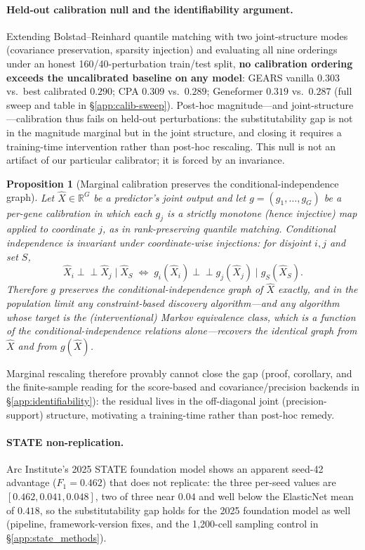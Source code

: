 \documentclass{article}
\theoremstyle{plain}
\newtheorem{proposition}[theorem]{Proposition}
\theoremstyle{definition}
\theoremstyle{remark}
\begin{document}
\paragraph{Held-out calibration null and the identifiability argument.}
\label{sec:calib-sweep}
Extending Bolstad--Reinhard quantile matching with two joint-structure modes (covariance preservation, sparsity injection) and evaluating all nine orderings under an honest 160/40-perturbation train/test split, \textbf{no calibration ordering exceeds the uncalibrated baseline on any model}: GEARS vanilla $0.303$ vs.\ best calibrated $0.290$; CPA $0.309$ vs.\ $0.289$; Geneformer $0.319$ vs.\ $0.287$ (full sweep and table in \S\ref{app:calib-sweep}). Post-hoc magnitude---and joint-structure---calibration thus fails on held-out perturbations: the substitutability gap is not in the magnitude marginal but in the joint structure, and closing it requires a training-time intervention rather than post-hoc rescaling. This null is not an artifact of our particular calibrator; it is forced by an invariance.

\begin{proposition}[Marginal calibration preserves the conditional-independence graph]
\label{prop:ci-invariance}
Let $\hat X \in \mathbb{R}^{G}$ be a predictor's joint output and let $g=(g_1,\dots,g_G)$ be a per-gene calibration in which each $g_j$ is a strictly monotone (hence injective) map applied to coordinate $j$, as in rank-preserving quantile matching. Conditional independence is invariant under coordinate-wise injections: for disjoint $i,j$ and set $S$,
\[
\hat X_i \perp\!\!\!\perp \hat X_j \mid \hat X_S \;\iff\; g_i(\hat X_i) \perp\!\!\!\perp g_j(\hat X_j) \mid g_S(\hat X_S).
\]
Therefore $g$ preserves the conditional-independence graph of $\hat X$ exactly, and in the population limit any constraint-based discovery algorithm---and any algorithm whose target is the (interventional) Markov equivalence class, which is a function of the conditional-independence relations alone---recovers the identical graph from $\hat X$ and from $g(\hat X)$.
\end{proposition}

Marginal rescaling therefore provably cannot close the gap (proof, corollary, and the finite-sample reading for the score-based and covariance/precision backends in \S\ref{app:identifiability}): the residual lives in the off-diagonal joint (precision-support) structure, motivating a training-time rather than post-hoc remedy.

\paragraph{STATE non-replication.}
\label{sec:state-multi-seed}
Arc Institute's 2025 STATE foundation model shows an apparent seed-42 advantage ($F_1 = 0.462$) that does not replicate: the three per-seed values are $[0.462, 0.041, 0.048]$, two of three near $0.04$ and well below the ElasticNet mean of $0.418$, so the substitutability gap holds for the 2025 foundation model as well (pipeline, framework-version fixes, and the 1{,}200-cell sampling control in \S\ref{app:state_methods}).
\end{document}
